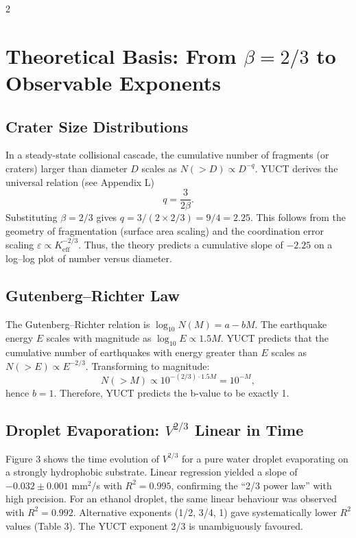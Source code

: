 \documentclass[11pt,a4paper]{article}
\newcommand{\eps}{\varepsilon}
\newcommand{\Keff}{K_{\mathrm{eff}}}
\newcommand{\betaf}{\beta}
\begin{document}
\begin{multicols}{2}
		\section{Theoretical Basis: From \(\betaf = 2/3\) to Observable Exponents}
		
		\subsection{Crater Size Distributions}
		
		In a steady-state collisional cascade, the cumulative number of fragments (or craters) larger than diameter \(D\) scales as \(N(>D) \propto D^{-q}\). YUCT derives the universal relation (see Appendix L)
		\[
		q = \frac{3}{2\betaf}.
		\]
		Substituting \(\betaf = 2/3\) gives \(q = 3/(2 \times 2/3) = 9/4 = 2.25\). This follows from the geometry of fragmentation (surface area scaling) and the coordination error scaling \(\eps \propto \Keff^{-2/3}\). Thus, the theory predicts a cumulative slope of \(-2.25\) on a log–log plot of number versus diameter.
		
		\subsection{Gutenberg–Richter Law}
		
		The Gutenberg–Richter relation \cite{GutenbergRichter1954} is \(\log_{10} N(M) = a - b M\). The earthquake energy \(E\) scales with magnitude as \(\log_{10} E \propto 1.5 M\). YUCT predicts that the cumulative number of earthquakes with energy greater than \(E\) scales as \(N(>E) \propto E^{-2/3}\). Transforming to magnitude:
		\[
		N(>M) \propto 10^{-(2/3) \cdot 1.5 M} = 10^{-M},
		\]
		hence \(b = 1\). Therefore, YUCT predicts the b-value to be exactly 1.
		
\subsection{Droplet Evaporation: $V^{2/3}$ Linear in Time}

Figure 3 shows the time evolution of \(V^{2/3}\) for a pure water droplet evaporating on a strongly hydrophobic substrate. Linear regression yielded a slope of \(-0.032 \pm 0.001\) mm\(^2\)/s with \(R^2 = 0.995\), confirming the “2/3 power law” with high precision. For an ethanol droplet, the same linear behaviour was observed with \(R^2 = 0.992\). Alternative exponents (1/2, 3/4, 1) gave systematically lower \(R^2\) values (Table 3). The YUCT exponent 2/3 is unambiguously favoured.
		

\end{multicols}
\end{document}

